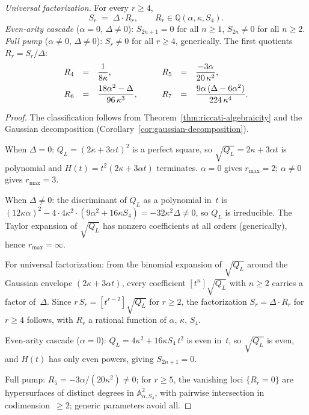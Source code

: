 \begin{theorem}
\noindent
\emph{Universal factorization.}\enspace
For every $r \geq 4$,
\begin{equation}\label{eq:universal-factorization}
  S_r \;=\; \Delta \cdot R_r,
  \qquad
  R_r \in \mathbb{Q}(\alpha, \kappa, S_4).
\end{equation}
\emph{Even-arity cascade}
\textup{(}$\alpha = 0$, $\Delta \neq 0$\textup{)}:
$S_{2n+1} = 0$ for all $n \geq 1$, $S_{2n} \neq 0$ for
all $n \geq 2$.
\emph{Full pump}
\textup{(}$\alpha \neq 0$, $\Delta \neq 0$\textup{)}:
$S_r \neq 0$ for all $r \geq 4$, generically.
The first quotients $R_r = S_r/\Delta$:
\begin{equation}\label{eq:pump-coefficients}
\renewcommand{\arraystretch}{1.4}
\begin{array}{rclrcl}
  R_4 &=& \displaystyle\frac{1}{8\kappa},
  &\qquad
  R_5 &=& \displaystyle\frac{-3\alpha}{20\,\kappa^2},
  \\[6pt]
  R_6 &=& \displaystyle
  \frac{18\alpha^2 - \Delta}{96\,\kappa^3},
  &\qquad
  R_7 &=& \displaystyle
  \frac{9\alpha\,(\Delta - 6\alpha^2)}{224\,\kappa^4}.
\end{array}
\end{equation}
\end{theorem}

\begin{proof}
The classification follows from
Theorem~\ref{thm:riccati-algebraicity} and the Gaussian
decomposition (Corollary~\ref{cor:gaussian-decomposition}).

When $\Delta = 0$: $Q_L = (2\kappa + 3\alpha t)^2$
is a perfect square, so $\sqrt{Q_L} = 2\kappa + 3\alpha t$
is polynomial and $H(t) = t^2(2\kappa + 3\alpha t)$
terminates.  $\alpha = 0$ gives $r_{\max} = 2$;
$\alpha \neq 0$ gives $r_{\max} = 3$.

When $\Delta \neq 0$: the
discriminant of $Q_L$ as a polynomial in~$t$ is
$(12\kappa\alpha)^2 - 4 \cdot 4\kappa^2
\cdot (9\alpha^2 + 16\kappa S_4) = -32\kappa^2\Delta
\neq 0$,
so $Q_L$ is irreducible.
The Taylor expansion of $\sqrt{Q_L}$ has nonzero
coefficients at all orders (generically),
hence $r_{\max} = \infty$.

For universal factorization: from the binomial expansion
of $\sqrt{Q_L}$ around the Gaussian envelope
$(2\kappa + 3\alpha t)$,
every coefficient $[t^n]\sqrt{Q_L}$ with $n \geq 2$
carries a factor of~$\Delta$.
Since $r\,S_r = [t^{r-2}]\sqrt{Q_L}$ for $r \geq 2$,
the factorization $S_r = \Delta \cdot R_r$ for $r \geq 4$
follows, with $R_r$ a rational function of $\alpha$,
$\kappa$, $S_4$.

Even-arity cascade ($\alpha = 0$):
$Q_L = 4\kappa^2 + 16\kappa S_4\,t^2$ is even in~$t$,
so $\sqrt{Q_L}$ is even, and $H(t)$ has only even powers,
giving $S_{2n+1} = 0$.

Full pump: $R_5 = -3\alpha/(20\kappa^2) \neq 0$;
for $r \geq 5$, the vanishing loci $\{R_r = 0\}$ are
hypersurfaces of distinct degrees in
$\mathbb{A}^2_{\alpha,S_4}$,
with pairwise intersection in codimension~$\geq 2$;
generic parameters avoid all.
\end{proof}

